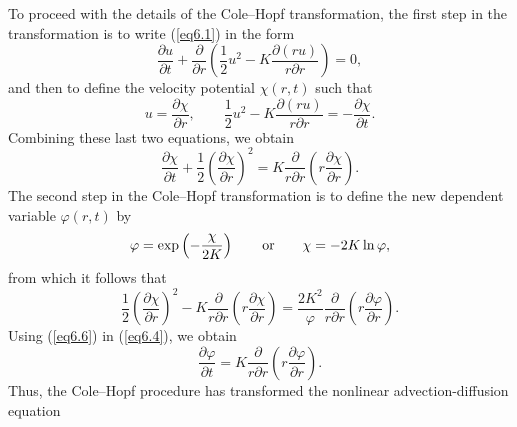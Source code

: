 \documentclass[10pt]{article}
\begin{document}
To proceed with the details of the Cole--Hopf transformation,
the first step in the transformation is to write (\ref{eq6.1}) in the form
\begin{equation}                                 %
       \frac{\partial u}{\partial t}
     + \frac{\partial}{\partial r}\left(\frac{1}{2}u^2
                                     - K\frac{\partial(ru)}{r\partial r}\right) = 0,
\label{eq6.2}
\end{equation}
and then to define the velocity potential $\chi(r,t)$ such that
\begin{equation}                                 %
       u = \frac{\partial\chi}{\partial r},   \qquad
     \frac{1}{2}u^2 - K\frac{\partial(ru)}{r\partial r}
                    = -\frac{\partial\chi}{\partial t}.
\label{eq6.3}
\end{equation}
Combining these last two equations, we obtain
\begin{equation}                                 %
                         \frac{\partial\chi}{\partial t}
     +  \frac{1}{2}\left(\frac{\partial\chi}{\partial r}\right)^2
     = K\frac{\partial}{r\partial r}\left(r\frac{\partial\chi}{\partial r}\right).
\label{eq6.4}
\end{equation}
The second step in the Cole--Hopf transformation is to define the new dependent
variable $\varphi(r,t)$ by
\begin{equation}                                 %
            \varphi = \exp\left(-\frac{\chi}{2K}\right)
                                 \qquad {\rm or}  \qquad
               \chi = -2K \ln\varphi,
\label{eq6.5}
\end{equation}
from which it follows that
\begin{equation}                                 %
         \frac{1}{2}\left(\frac{\partial\chi}{\partial r}\right)^2
     - K \frac{\partial}{r\partial r}\left(r\frac{\partial\chi}{\partial r}\right)
     = \frac{2K^2}{\varphi} \frac{\partial}{r\partial r}
                     \left(r\frac{\partial\varphi}{\partial r}\right).
\label{eq6.6}
\end{equation}
Using (\ref{eq6.6}) in (\ref{eq6.4}), we obtain
\begin{equation}                                 %
        \frac{\partial\varphi}{\partial t}
     = K\frac{\partial}{r\partial r}\left(r\frac{\partial\varphi}{\partial r}\right).
\label{eq6.7}
\end{equation}
Thus, the Cole--Hopf procedure has transformed the nonlinear advection-diffusion equation
\end{document}

